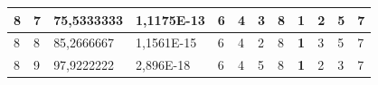 \documentclass[conference]{IEEEtran}
\begin{document}
\begin{table}[]
\begin{tabular}{|llll|llllllll|}
\multicolumn{1}{|l|}{8}                                                     & \multicolumn{1}{l|}{7}                                                        & \multicolumn{1}{l|}{75,5333333}                                                   & 1,1175E-13                     & \multicolumn{1}{l|}{6}                                                  & \multicolumn{1}{l|}{4}                                                  & \multicolumn{1}{l|}{3}                                                  & \multicolumn{1}{l|}{8}                                                  & \multicolumn{1}{l|}{\textbf{1}}                                         & \multicolumn{1}{l|}{2}                                                  & \multicolumn{1}{l|}{5}                                                  & 7                          \\ \hline
\multicolumn{1}{|l|}{8}                                                     & \multicolumn{1}{l|}{8}                                                        & \multicolumn{1}{l|}{85,2666667}                                                   & 1,1561E-15                     & \multicolumn{1}{l|}{6}                                                  & \multicolumn{1}{l|}{4}                                                  & \multicolumn{1}{l|}{2}                                                  & \multicolumn{1}{l|}{8}                                                  & \multicolumn{1}{l|}{\textbf{1}}                                         & \multicolumn{1}{l|}{3}                                                  & \multicolumn{1}{l|}{5}                                                  & 7                          \\ \hline
\multicolumn{1}{|l|}{8}                                                     & \multicolumn{1}{l|}{9}                                                        & \multicolumn{1}{l|}{97,9222222}                                                   & 2,896E-18                      & \multicolumn{1}{l|}{6}                                                  & \multicolumn{1}{l|}{4}                                                  & \multicolumn{1}{l|}{5}                                                  & \multicolumn{1}{l|}{8}                                                  & \multicolumn{1}{l|}{\textbf{1}}                                         & \multicolumn{1}{l|}{2}                                                  & \multicolumn{1}{l|}{3}                                                  & 7                          \\ \hline

\end{tabular}
\end{table}
\end{document}
